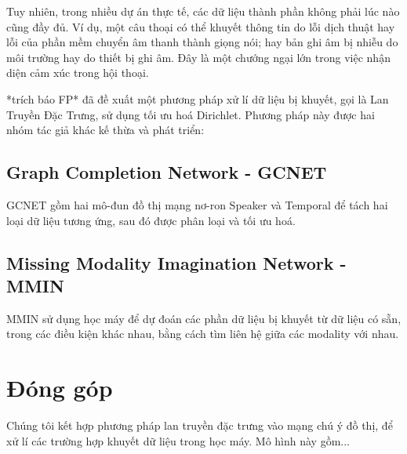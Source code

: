 Tuy nhiên, trong nhiều dự án thực tế, các dữ liệu thành phần không phải lúc nào cũng đầy đủ. 
Ví dụ, một câu thoại có thể khuyết thông tin do lỗi dịch thuật hay lỗi của phần mềm chuyển âm thanh thành giọng nói; hay bản ghi âm bị nhiễu do môi trường hay do thiết bị ghi âm.
Đây là một chướng ngại lớn trong việc nhận diện cảm xúc trong hội thoại. 


*trích báo FP* đã đề xuất một phương pháp xử lí dữ liệu bị khuyết, gọi là Lan Truyền Đặc Trưng, sử dụng tối ưu hoá Dirichlet. 
Phương pháp này được hai nhóm tác giả khác kế thừa và phát triển: 

\subsection{Graph Completion Network - GCNET}
GCNET gồm hai mô-đun đồ thị mạng nơ-ron Speaker và Temporal để tách hai loại dữ liệu tương ứng, sau đó được phân loại và tối ưu hoá.

\subsection{Missing Modality Imagination Network - MMIN}
MMIN sử dụng học máy để dự đoán các phần dữ liệu bị khuyết từ dữ liệu có sẵn, trong các điều kiện khác nhau, bằng cách tìm liên hệ giữa các modality với nhau.


\section{Đóng góp}
\label{sec:Đóng góp}

Chúng tôi kết hợp phương pháp lan truyền đặc trưng vào mạng chú ý đồ thị, để xử lí các trường hợp khuyết dữ liệu trong học máy. 
Mô hình này gồm...